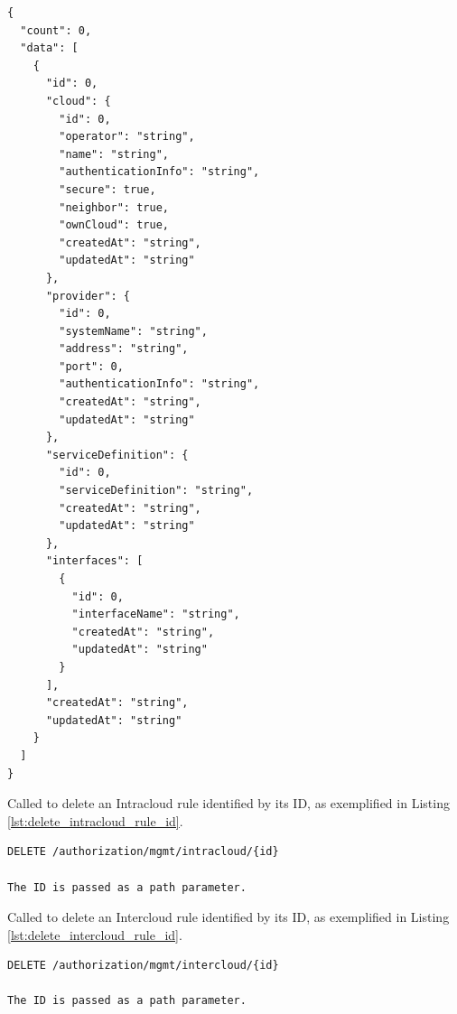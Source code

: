 \documentclass[a4paper]{arrowhead}
\newcommand{\fref}[1]{{\textcolor{ArrowheadBlue}{\hyperref[sec:functions:#1]{#1}}}}
\begin{document}
\begin{lstlisting}[language=http,label={lst:add_intercloud_rules_intercloudruleslist},caption={An \fref{Add Intercloud Rules} response is an IntercloudRuleList}]
{
  "count": 0,
  "data": [
    {
      "id": 0,
      "cloud": {
        "id": 0,
        "operator": "string",
        "name": "string",
        "authenticationInfo": "string",
        "secure": true,
        "neighbor": true,
        "ownCloud": true,
        "createdAt": "string",
        "updatedAt": "string"
      },
      "provider": {
        "id": 0,
        "systemName": "string",
        "address": "string",
        "port": 0,
        "authenticationInfo": "string",
        "createdAt": "string",
        "updatedAt": "string"
      },
      "serviceDefinition": {
        "id": 0,
        "serviceDefinition": "string",
        "createdAt": "string",
        "updatedAt": "string"
      },
      "interfaces": [
        {
          "id": 0,
          "interfaceName": "string",
          "createdAt": "string",
          "updatedAt": "string"
        }
      ],
      "createdAt": "string",
      "updatedAt": "string"
    }
  ]
}

\end{lstlisting}


Called to delete an Intracloud rule identified by its ID, as exemplified in Listing \ref{lst:delete_intracloud_rule_id}.

\begin{lstlisting}[language=http,label={lst:delete_intracloud_rule_id},caption={An \fref{Intracloud rule deletion} invocation.}]
DELETE /authorization/mgmt/intracloud/{id}

The ID is passed as a path parameter.

\end{lstlisting}


Called to delete an Intercloud rule identified by its ID, as exemplified in Listing \ref{lst:delete_intercloud_rule_id}.

\begin{lstlisting}[language=http,label={lst:delete_intercloud_rule_id},caption={An \fref{Intercloud rule deletion} invocation.}]
DELETE /authorization/mgmt/intercloud/{id}

The ID is passed as a path parameter.

\end{lstlisting}
\end{document}
